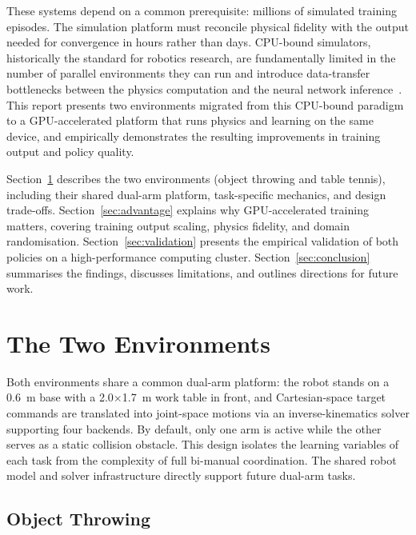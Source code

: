 \documentclass[11pt, a4paper]{article}
\begin{document}
These systems depend on a common prerequisite: millions of simulated training episodes. The simulation platform must reconcile physical fidelity with the output needed for convergence in hours rather than days. CPU-bound simulators, historically the standard for robotics research, are fundamentally limited in the number of parallel environments they can run and introduce data-transfer bottlenecks between the physics computation and the neural network inference~\cite{isaac_lab}. This report presents two environments migrated from this CPU-bound paradigm to a GPU-accelerated platform that runs physics and learning on the same device, and empirically demonstrates the resulting improvements in training output and policy quality.

Section~\ref{sec:environments} describes the two environments (object throwing and table tennis), including their shared dual-arm platform, task-specific mechanics, and design trade-offs. Section~\ref{sec:advantage} explains why GPU-accelerated training matters, covering training output scaling, physics fidelity, and domain randomisation. Section~\ref{sec:validation} presents the empirical validation of both policies on a high-performance computing cluster. Section~\ref{sec:conclusion} summarises the findings, discusses limitations, and outlines directions for future work.

\section{The Two Environments}
\label{sec:environments}

Both environments share a common dual-arm platform: the robot stands on a 0.6~m base with a 2.0$\times$1.7~m work table in front, and Cartesian-space target commands are translated into joint-space motions via an inverse-kinematics solver supporting four backends. By default, only one arm is active while the other serves as a static collision obstacle. This design isolates the learning variables of each task from the complexity of full bi-manual coordination. The shared robot model and solver infrastructure directly support future dual-arm tasks.

\subsection{Object Throwing}
\end{document}
